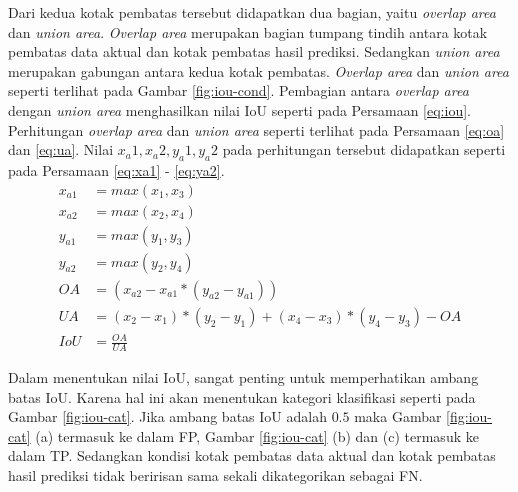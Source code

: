 Dari kedua kotak pembatas tersebut didapatkan dua bagian, yaitu \textit{overlap area} dan \textit{union area}. \textit{Overlap area} merupakan bagian tumpang tindih antara kotak pembatas data aktual dan kotak pembatas hasil prediksi. Sedangkan \textit{union area} merupakan gabungan antara kedua kotak pembatas. \textit{Overlap area} dan \textit{union area} seperti terlihat pada Gambar \ref{fig:iou-cond}. Pembagian antara \textit{overlap area} dengan \textit{union area} menghasilkan nilai IoU seperti pada Persamaan \ref{eq:iou}. Perhitungan \textit{overlap area} dan \textit{union area} seperti terlihat pada Persamaan \ref{eq:oa} dan \ref{eq:ua}. Nilai $x_a1, x_a2, y_a1, y_a2$ pada perhitungan tersebut didapatkan seperti pada Persamaan \ref{eq:xa1} - \ref{eq:ya2}.
\begin{align}
    \label{eq:xa1}
    x_{a1} &= max(x_1, x_3)\\
    \label{eq:xa2}
    x_{a2} &= max(x_2, x_4)\\
    \label{eq:ya1}
    y_{a1} &= max(y_1, y_3)\\
    \label{eq:ya2}
    y_{a2} &= max(y_2, y_4)\\
    \label{eq:oa}
    OA     &= (x_{a2}-x_{a1}\ast (y_{a2}-y_{a1}))\\
    \label{eq:ua}
    UA     &= (x_2-x_1)\ast (y_2-y_1) + (x_4-x_3)\ast (y_4-y_3) - OA\\
    \label{eq:iou}
    IoU    &= \frac{OA}{UA}
\end{align}

Dalam menentukan nilai IoU, sangat penting untuk memperhatikan ambang batas IoU. Karena hal ini akan menentukan kategori klasifikasi seperti pada Gambar \ref{fig:iou-cat}. Jika ambang batas IoU adalah $0.5$ maka Gambar \ref{fig:iou-cat} (a) termasuk ke dalam FP, Gambar \ref{fig:iou-cat} (b) dan (c) termasuk ke dalam TP. Sedangkan kondisi kotak pembatas data aktual dan kotak pembatas hasil prediksi tidak beririsan sama sekali dikategorikan sebagai FN.

